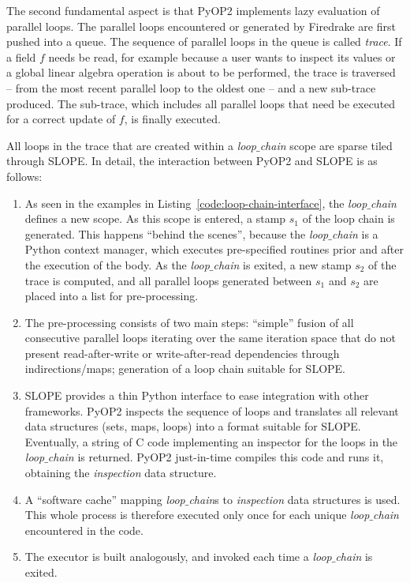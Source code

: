 The second fundamental aspect is that PyOP2 implements lazy evaluation of parallel loops. The parallel loops encountered or generated by Firedrake are first pushed into a queue. The sequence of parallel loops in the queue is called {\em trace}. If a field $f$ needs be read, for example because a user wants to inspect its values or a global linear algebra operation is about to be performed, the trace is traversed -- from the most recent parallel loop to the oldest one -- and a new sub-trace produced. The sub-trace, which includes all parallel loops that need be executed for a correct update of $f$, is finally executed. 

All loops in the trace that are created within a {\em loop$\_$chain} scope are sparse tiled through SLOPE. In detail, the interaction between PyOP2 and SLOPE is as follows:
\begin{enumerate}
\item As seen in the examples in Listing~\ref{code:loop-chain-interface}, the {\em loop$\_$chain} defines a new scope. As this scope is entered, a stamp $s_1$ of the loop chain is generated. This happens ``behind the scenes'', because the {\em loop$\_$chain} is a Python context manager, which executes pre-specified routines prior and after the execution of the body. As the {\em loop$\_$chain} is exited, a new stamp $s_2$ of the trace is computed, and all parallel loops generated between $s_1$ and $s_2$ are placed into a list for pre-processing.
\item The pre-processing consists of two main steps: ``simple'' fusion of all consecutive parallel loops iterating over the same iteration space that do not present read-after-write or write-after-read dependencies through indirections/maps; generation of a loop chain suitable for SLOPE.
\item SLOPE provides a thin Python interface to ease integration with other frameworks. PyOP2 inspects the sequence of loops and translates all relevant data structures (sets, maps, loops) into a format suitable for SLOPE. Eventually, a string of C code implementing an inspector for the loops in the {\em loop$\_$chain} is returned. PyOP2 just-in-time compiles this code and runs it, obtaining the {\em inspection} data structure.
\item A ``software cache'' mapping {\em loop$\_$chain}s to {\em inspection} data structures is used. This whole process is therefore executed only once for each unique {\em loop$\_$chain} encountered in the code. 
\item The executor is built analogously, and invoked each time a {\em loop$\_$chain} is exited.
\end{enumerate}

